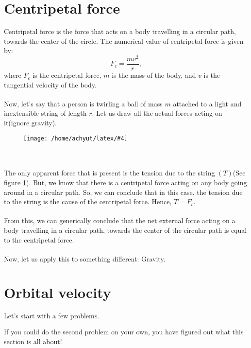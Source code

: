 \documentclass[a4paper]{report}
\newcommand{\mkfig}[5]{
  \begin{figure}[#1]
    \centering
    \texttt{[image: /home/achyut/latex/\#4]}
    \caption{\centering{#5}}
    \label{fig.#2}
  \end{figure}
}
\begin{document}
\section{Centripetal force}
Centripetal force is the force that acts on a body travelling in a circular path, towards the center of the 
circle. The numerical value of centripetal force is given by: $$F_c=\frac{mv^2}{r},$$
where $F_c$ is the centripetal force, $m$ is the mass of the body, and $v$ is the tangential velocity of the 
body.\\\\
Now, let's say that a person is twirling a ball of mass $m$ attached to a light and inextensible string of length
$r$.
Let us draw all the actual forces acting on it(ignore gravity).
\mkfig{h!}{5}{2}{presentation.5.png}{Forces acting on mass} \\\\
The only apparent force that is present is the tension due to the string $(T)$(See figure \ref{fig.5}).
But, we know that there is a centripetal force acting on any body going around in a circular path.
So, we can conclude that in this case, the tension due to the string is the cause of the centripetal force.
Hence, $T=F_c$.\\\\
From this, we can generically conclude that the net external force acting on a body travelling in a circular 
path, towards the center of the circular path is equal to the centripetal force. \\\\
Now, let us apply this to something different: Gravity.

\section{Orbital velocity} \label{sec.2}
Let's start with a few problems.
  \begin{tcolorbox}
  \end{tcolorbox}
    \begin{tcolorbox}
    \end{tcolorbox}
If you could do the second problem on your own, you have figured out what this section is all about!\\
\end{document}
